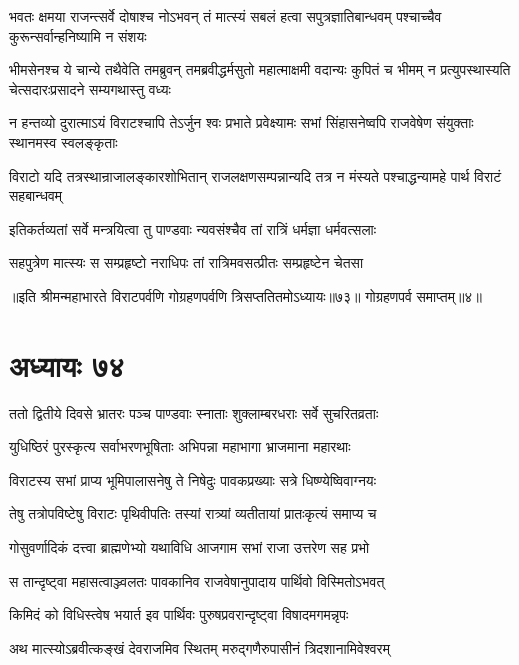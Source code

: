 


\threelineshloka
{भवतः क्षमया राजन्त्सर्वे दोषाश्च नोऽभवन्}
{तं मात्स्यं सबलं हत्वा सपुत्रज्ञातिबान्धवम्}
{पश्चाच्चैव कुरून्सर्वान्हनिष्यामि न संशयः}


\onelineshloka
{भीमसेनश्च ये चान्ये तथैवेति तमब्रुवन्}
\twolineshloka
{तमब्रवीद्धर्मसुतो महात्माक्षमी वदान्यः कुपितं च भीमम्}
{न प्रत्युपस्थास्यति चेत्सदारःप्रसादने सम्यगथास्तु वध्यः}


\onelineshloka
{न हन्तव्यो दुरात्माऽयं विराटश्चापि तेऽर्जुन}
\twolineshloka
{श्वः प्रभाते प्रवेक्ष्यामः सभां सिंहासनेष्वपि}
{राजवेषेण संयुक्ताः स्थानमस्व स्वलङ्कृताः}


\threelineshloka
{विराटो यदि तत्रस्थान्राजालङ्कारशोभितान्}
{राजलक्षणसम्पन्नान्यदि तत्र न मंस्यते}
{पश्चाद्धन्यामहे पार्थ विराटं सहबान्धवम्}


\twolineshloka
{इतिकर्तव्यतां सर्वे मन्त्रयित्वा तु पाण्डवाः}
{न्यवसंश्चैव तां रात्रिं धर्मज्ञा धर्मवत्सलाः}


\twolineshloka
{सहपुत्रेण मात्स्यः स सम्प्रहृष्टो नराधिपः}
{तां रात्रिमवसत्प्रीतः सम्प्रहृष्टेन चेतसा}

॥इति श्रीमन्महाभारते विराटपर्वणि गोग्रहणपर्वणि त्रिसप्ततितमोऽध्यायः॥७३॥ गोग्रहणपर्व समाप्तम्॥४॥

\chapter{अध्यायः ७४}
\twolineshloka
{ततो द्वितीये दिवसे भ्रातरः पञ्च पाण्डवाः}
{स्नाताः शुक्लाम्बरधराः सर्वे सुचरितव्रताः}


\twolineshloka
{युधिष्ठिरं पुरस्कृत्य सर्वाभरणभूषिताः}
{अभिपन्ना महाभागा भ्राजमाना महारथाः}


\twolineshloka
{विराटस्य सभां प्राप्य भूमिपालासनेषु ते}
{निषेदुः पावकप्रख्याः सत्रे धिष्ण्येष्विवाग्नयः}


\twolineshloka
{तेषु तत्रोपविष्टेषु विराटः पृथिवीपतिः}
{तस्यां रात्र्यां व्यतीतायां प्रातःकृत्यं समाप्य च}


\twolineshloka
{गोसुवर्णादिकं दत्त्वा ब्राह्मणेभ्यो यथाविधि}
{आजगाम सभां राजा उत्तरेण सह प्रभो}


\twolineshloka
{स तान्दृष्ट्वा महासत्वाञ्ज्वलतः पावकानिव}
{राजवेषानुपादाय पार्थिवो विस्मितोऽभवत्}



\twolineshloka
{किमिदं को विधिस्त्वेष भयार्त इव पार्थिवः}
{पुरुषप्रवरान्दृष्ट्वा विषादमगमन्नृपः}


\twolineshloka
{अथ मात्स्योऽब्रवीत्कङ्खं देवराजमिव स्थितम्}
{मरुद्गणैरुपासीनं त्रिदशानामिवेश्वरम्}


